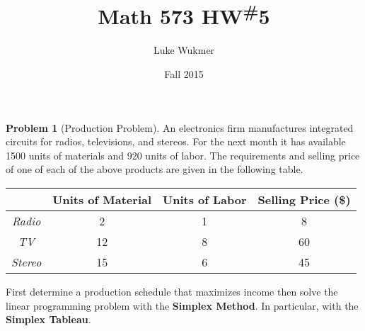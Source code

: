 \documentclass[11pt]{article}
\theoremstyle{plain}
\theoremstyle{definition}
\newtheorem{prob}{Problem}
\numberwithin{equation}{section}
\begin{document}
\title{Math 573 HW\textsuperscript{\#}5}
\author{Luke Wukmer}
\date{Fall 2015}
\maketitle \thispagestyle{empty} %
\lstset{language=Python}

\begin{prob}[Production Problem]

An electronics firm manufactures integrated circuits for radios,
televisions, and stereos. For the next month it has available 1500 units of materials and 920
units of labor. The requirements and selling price of one of each of the above products are
given in the following table.

\begin{center}
\begin{tabu}{>{\itshape}c|ccc}
    \hline
    \rowfont{\itshape} &  Units of Material & Units of Labor & Selling Price (\$) \\
    \hline 
    Radio  & 2    & 1   & 8 \\
    TV     & 12   & 8   & 60 \\
    Stereo & 15   & 6   & 45 
\end{tabu}
\end{center}

First determine a production schedule that maximizes income then solve
the linear programming problem with the \textbf{Simplex Method}.
In particular, with the \textbf{Simplex Tableau}.
\end{prob}
\end{document}
